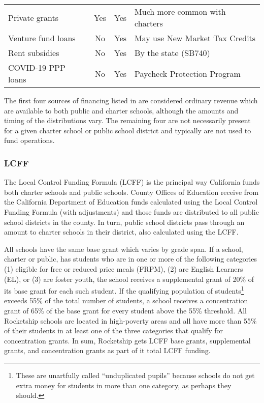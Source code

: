 \begin{table}[ht]
\begin{tabularx}{0.9\textwidth}{lccl}
    Private grants       & Yes & Yes                         & Much more common with charters\\
    Venture fund loans   & No  & Yes                         & May use New Market Tax Credits\\
    Rent subsidies       & No  & Yes                         & By the state (SB740)\\
    COVID-19 PPP loans   & No  & Yes                         & Paycheck Protection Program\\
    \bottomrule
  \end{tabularx}
\end{table}

The first four sources of financing listed in  are considered ordinary revenue which are available to both public and charter schools, although the amounts and timing of the distributions vary. The remaining four are not necessarily present for a given charter school or public school district and typically are not used to fund operations.
\subsubsection{LCFF}%
\label{sec:lcff}\indent%

The Local Control Funding Formula (LCFF) is the principal way California funds both charter schools and public schools. County Offices of Education receive from the California Department of Education funds calculated using the Local Control Funding Formula (with adjustments) and those funds are distributed to all public school districts in the county. In turn, public school districts pass through an amount to charter schools in their district, also calculated using the LCFF.

All schools have the same base grant which varies by grade span. If a school, charter or public, has students who are in one or more of the following categories (1) eligible for free or reduced price meals (FRPM), (2) are English Learners (EL), or (3) are foster youth, the school receives a supplemental grant of 20\% of its base grant for each such student. If the qualifying population of students\footnote{These are unartfully called ``unduplicated pupils'' because schools do not get extra money for students in more than one category, as perhaps they should.} exceeds 55\% of the total number of students, a school receives a concentration grant of 65\% of the base grant for every student above the 55\% threshold. All Rocketship schools are located in high-poverty areas and all have more than 55\% of their students in at least one of the three categories that qualify for concentration grants. In sum, Rocketship gets LCFF base grants, supplemental grants, and concentration grants as part of it total LCFF funding.

